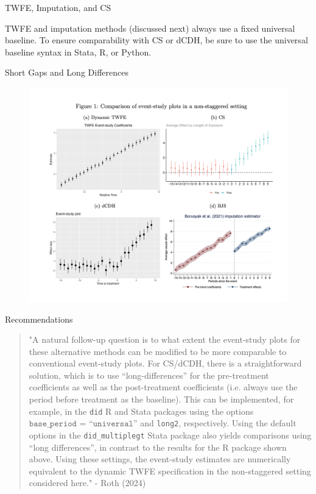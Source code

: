\documentclass{beamer}
\begin{document}
\begin{frame}{TWFE, Imputation, and CS}

TWFE and imputation methods (discussed next) always use a fixed universal baseline. To ensure comparability with CS or dCDH, be sure to use the universal baseline syntax in Stata, R, or Python.

\end{frame}


\begin{frame}{Short Gaps and Long Differences}

\begin{figure}[h]
    \centering
    \includegraphics[width=\linewidth, height=0.8\textheight, keepaspectratio]{./lecture_includes/shortgap}
\end{figure}

\end{frame}

\begin{frame}{Recommendations}

\begin{quote}
"A natural follow-up question is to what extent the event-study plots for these alternative methods can be modified to be more comparable to conventional event-study plots. For CS/dCDH, there is a straightforward solution, which is to use “long-diﬀerences” for the pre-treatment coeﬃcients as well as the post-treatment coeﬃcients (i.e. always use the period before treatment as the baseline). This can be implemented, for example, in the \texttt{did} R and Stata packages using the options $\texttt{base_period = “universal”}$ and \texttt{long2}, respectively.  Using the default options in the \texttt{did_multiplegt} Stata package also yields comparisons using “long diﬀerences”, in contrast to the results for the R package shown above. Using these settings, the event-study estimates are numerically equivalent to the dynamic TWFE specification in the non-staggered setting considered here." - Roth (2024)
\end{quote}

\end{frame}
\end{document}

